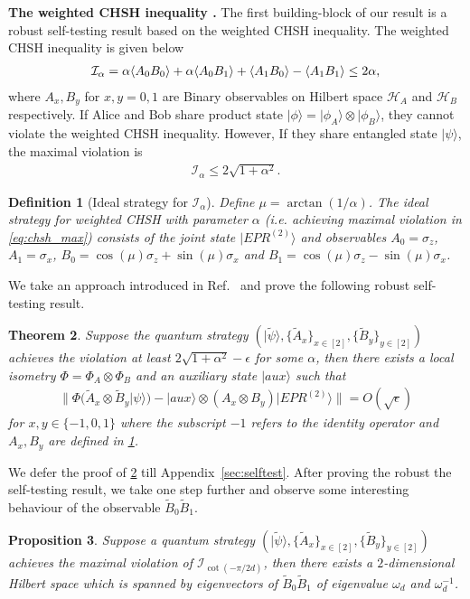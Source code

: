 \documentclass[11pt,letterpaper]{article}
\newcommand{\ket}[1]{|#1\rangle}
\newcommand{\x}{\otimes}
\DeclarePairedDelimiter{\ip}{\langle}{\rangle}
\newcommand{\calH}{\mathcal{H}}
\newcommand{\1}{\mathbb{1}}
\newcommand{\EPR}[1]{EPR^{(#1)}}
\newcommand{\paulix}{\sigma_x}
\newcommand{\pauliz}{\sigma_z}
\newcommand{\tpsi}{\tilde{\psi}}
\newcommand{\I}{\mathcal{I}}
\newtheorem{theorem}{Theorem}
\newtheorem{proposition}[theorem]{Proposition}
\newtheorem{definition}[theorem]{Definition}
\theoremstyle{definition}
\begin{document}
\textbf{The weighted CHSH inequality \cite{acin2012}.}
The first building-block of our result is a robust self-testing result based on the weighted CHSH inequality.
The weighted CHSH inequality is given below 
\begin{align}
	\label{eq:chsh_op}
	\I_\alpha = \alpha\ip{A_0B_0}+\alpha\ip{A_0B_1} + \ip{A_1B_0} - \ip{A_1B_1}\leq 2\alpha,
\end{align}
where $A_x,B_y$ for $x,y = 0,1$ are Binary observables on Hilbert space $\calH_A$ and $\calH_B$ respectively.
If Alice and Bob share product state $\ket{\phi} = \ket{\phi_A} \x \ket{\phi_B}$, they cannot violate
the weighted CHSH inequality.
However, If they share entangled state $\ket{\psi}$, the maximal violation is 
\begin{align}
\label{eq:chsh_max}
 \I_\alpha \leq 2\sqrt{1+\alpha^2}.
\end{align}
\begin{definition}[Ideal strategy for $\I_\alpha$]
	\label{def:ideal}
	Define $\mu = \arctan(1/\alpha)$.
	The ideal strategy for weighted CHSH with parameter $\alpha$ (i.e. achieving maximal violation in \cref{eq:chsh_max})
	consists of the joint state $\ket{\EPR{2}}$ and observables $A_0 = \pauliz$, $A_1 = \paulix$,
	$B_0 = \cos(\mu) \pauliz+ \sin(\mu) \paulix$ and $B_1 = \cos(\mu) \pauliz - \sin(\mu) \paulix$.
\end{definition}
We take an approach introduced in Ref.~\cite{bamps2015} and prove the following robust self-testing result.
\begin{theorem}
\label{thm:selftest}
	Suppose the quantum strategy $(\ket{\tpsi}, \{\tilde{A}_x\}_{x \in [2]}, \{\tilde{B}_y\}_{y \in [2]})$ achieves the violation
	at least $2\sqrt{1+\alpha^2} - \epsilon$
	for some $\alpha$, then
	there exists a local isometry $\Phi = \Phi_A \x \Phi_B$ and an auxiliary state $\ket{aux}$  such that
	\begin{align}
		\| \Phi( \tilde{A}_x \x \tilde{B}_y \ket{\psi}) -\ket{aux} \x (A_x \x B_y) \ket{\EPR{2}}  \| = O(\sqrt{\epsilon})
	\end{align}
	for $x,y \in \{-1, 0, 1\}$ where the subscript $-1$ refers to the identity operator and $A_x, B_y$ are 
	defined in \cref{def:ideal}.
\end{theorem}
We defer the proof of \cref{thm:selftest} till Appendix~\ref{sec:selftest}.
After proving the robust the self-testing result, we take one step further and observe some interesting behaviour of the 
observable $\tilde{B}_0\tilde{B}_1$.
\begin{proposition}
\label{prop:2d-subspace}
	Suppose a quantum strategy $(\ket{\tpsi}, \{\tilde{A}_x\}_{x \in [2]}, \{\tilde{B}_y\}_{y \in [2]})$ achieves the maximal 
	violation of  $\I_{\cot(-\pi/2d)}$, then there exists a $2$-dimensional Hilbert space which is spanned by eigenvectors of 
	$\tilde{B}_0\tilde{B}_1$ of eigenvalue $\omega_d$ and $\omega_d^{-1}$.
\end{proposition}
\end{document}
